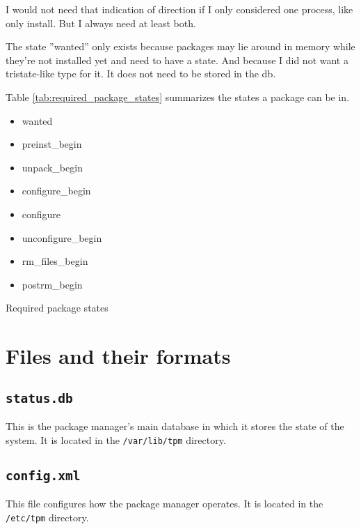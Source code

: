 \documentclass[a4paper]{scrartcl}
\newcommand{\file}[1]{\texttt{#1}}
\begin{document}
	I would not need that indication of direction if I only considered one process, like only install. But I always need at least both.
	
	The state ''wanted'' only exists because packages may lie around in memory while they're not installed yet and need to have a state. And because I did not want a tristate-like type for it. It does not need to be stored in the db.
	
	Table \ref{tab:required_package_states} summarizes the states a package can be in.
	
	\begin{table}[ht]
		\centering
		
		\begin{itemize}
			\item wanted
			\item preinst\_begin
			\item unpack\_begin
			\item configure\_begin
			\item configure
			\item unconfigure\_begin
			\item rm\_files\_begin
			\item postrm\_begin
		\end{itemize}
		
		\caption{Required package states}
		\label{tab:required_package_states}
	\end{table}


	\section{Files and their formats}
	\label{sec:files_and_their_formats}
	
	
	\subsection{\file{status.db}}
	\label{ssec:status.db}
	
	This is the package manager's main database in which it stores the state of the system. It is located in the \file{/var/lib/tpm} directory.


	\subsection{\file{config.xml}}
	\label{ssec:config.xml}
	
	This file configures how the package manager operates. It is located in the \file{/etc/tpm} directory.
	
\end{document}
